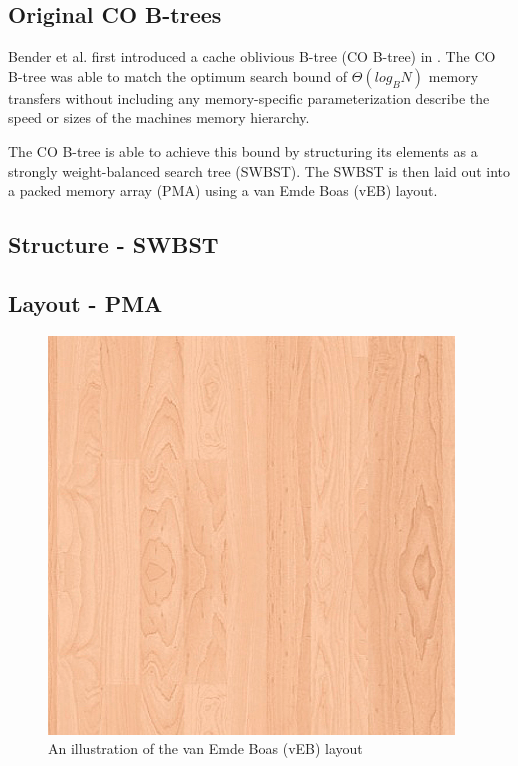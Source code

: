 \documentclass{style}
\begin{document}
\subsection{Original CO B-trees}
\label{sec:original}

Bender et al. first introduced a cache oblivious B-tree (CO B-tree) in \cite{cob tree}. The
CO B-tree was able to match the optimum search bound of $\Theta(log_B N)$ memory transfers 
without including any memory-specific parameterization describe the speed or sizes
of the machines memory hierarchy. 

The CO B-tree is able to achieve this bound by structuring its elements as a strongly weight-balanced
search tree (SWBST). The SWBST is then laid out into a packed memory array (PMA) using a van Emde Boas (vEB) layout.

\subsection{Structure - SWBST}
\label{sec:structure}



\subsection{Layout - PMA}
\label{sec:layout}

\begin{figure}

\begin{center}
	\includegraphics[width=0.8\columnwidth]{figures/veb.png}
\end{center}

\caption{An illustration of the van Emde Boas (vEB) layout}
\label{fig:veb}
\end{figure}
\end{document}
